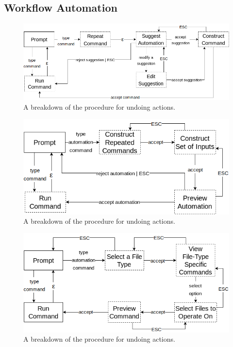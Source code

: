\subsection{Workflow Automation}

\begin{figure}[H]
  \centering
  \includegraphics[width=0.8\linewidth]{figures/alternatives/automate_a.png}
  \caption{A breakdown of the procedure for undoing actions.}
  \label{fig:undoa}
\end{figure}

\begin{figure}[H]
  \centering
  \includegraphics[width=0.8\linewidth]{figures/alternatives/automate_b.png}
  \caption{A breakdown of the procedure for undoing actions.}
  \label{fig:undob}
\end{figure}

\begin{figure}[H]
  \centering
  \includegraphics[width=0.8\linewidth]{figures/alternatives/automate_c.png}
  \caption{A breakdown of the procedure for undoing actions.}
  \label{fig:undoc}
\end{figure}

